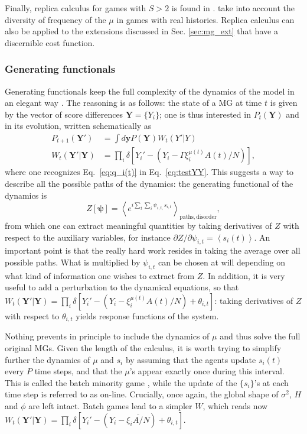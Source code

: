 \documentclass[aps,twocolumn,nofootinbib,sortedaddress,reprint]{revtex4-1}
\begin{document}
Finally, replica calculus for games with $S>2$ is found in
\textcite{MCZe00}. \textcite{CM00} take into account the diversity of
frequency of the $\mu$ in games with real histories.  Replica calculus
can also be applied to the extensions discussed in Sec.
\ref{sec:mg_ext} that have a discernible cost function.

\subsubsection{Generating functionals}

Generating functionals keep the full complexity of the dynamics of the
model in an elegant way \cite{DeDominicis}. The reasoning is as
follows: the state of a MG at time $t$ is given by the vector of score
differences $\mathbf{Y}=\{Y_{i}\}$; one is thus interested in $P_t(\mathbf{Y})$ and
in its evolution, written schematically as
\begin{align}
P_{t+1}(\mathbf{Y'})&=\int
d\mathbf{y}P(\mathbf{Y})W_t(Y'|Y)\\ W_t(\mathbf{Y'}|\mathbf{Y})&={\prod_i\delta[Y_i'-(Y_i-\Gamma\xi_i
    ^ {\mu(t)}A(t)/N)]},
\label{eq:testYY}
\end{align}
where one recognizes Eq.\ \eqref{eq:q_i(t)} in
Eq.\ \eqref{eq:testYY}. This suggests a way to describe all the
possible paths of the dynamics: the generating functional of the
dynamics is
\begin{equation}
Z[\mathbf{\psi}]=\left<e^{i\sum_t\sum_i\psi_{i,t,}s_{i,t}}\right>_\mathrm{paths,
  disorder},
\end{equation}
from which one can extract meaningful quantities by taking derivatives
of $Z$ with respect to the auxiliary variables, for instance $\partial
Z/\partial \psi_{i,t}=\left<s_i(t)\right>$. An important point is that
the really hard work resides in taking the average over all possible
paths. What is multiplied by $\psi_{i,t}$ can be chosen at will
depending on what kind of information one wishes to extract from
$Z$. In addition, it is very useful to add a perturbation to the
dynamical equations, so that
$W_t(\mathbf{Y'}|\mathbf{Y})={\prod_i\delta[Y_i'-(Y_i-\xi_i^{\mu(t)}
    A(t)/N)+\theta_{i,t}]}$: taking derivatives of $Z$ with
respect to $\theta_{i,t}$ yields response functions of the system.

Nothing prevents in principle to include the dynamics of $\mu$ and
thus solve the full original MGs. Given the length of the calculus, it
is worth trying to simplify further the dynamics of $\mu$ and $s_i$ by
assuming that the agents update $s_i(t)$ every $P$ time steps, and
that the $\mu$'s appear exactly once during this interval. This is
called the batch minority game \cite{Moro1}, while the update of the
$\{s_i\}$'s at each time step is referred to as on-line. Crucially,
once again, the global shape of $\sigma^2$, $H$ and $\phi$ are left
intact. Batch games lead to a simpler $W$, which reads now
$W_t(\mathbf{Y'}|\mathbf{Y})=\prod_i\delta[Y_i'-(Y_i-\overline{\xi_i
    A/N})+\theta_{i,t}]$.
\end{document}
